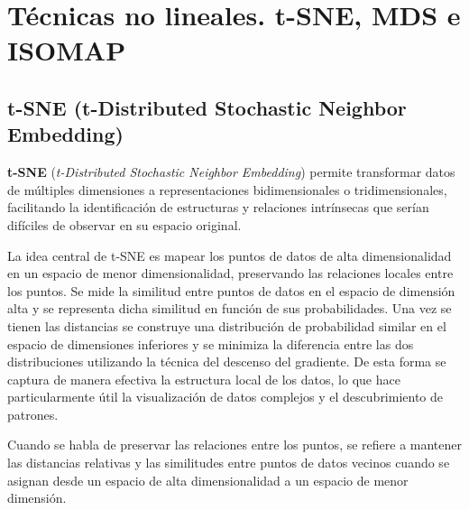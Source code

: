 \chapter{Técnicas no lineales. t-SNE, MDS e ISOMAP}

\section{t-SNE (t-Distributed Stochastic Neighbor Embedding)}

\textbf{t-SNE} (\textit{t-Distributed Stochastic Neighbor Embedding}) permite transformar datos de múltiples dimensiones a representaciones bidimensionales o tridimensionales, facilitando la identificación de estructuras y relaciones intrínsecas que serían difíciles de observar en su espacio original.

La idea central de t-SNE es mapear los puntos de datos de alta dimensionalidad en un espacio de menor dimensionalidad, preservando las relaciones locales entre los puntos. Se mide la similitud entre puntos de datos en el espacio de dimensión alta y se representa dicha similitud en función de sus probabilidades. Una vez se tienen las distancias se construye una distribución de probabilidad similar en el espacio de dimensiones inferiores y se minimiza la diferencia entre las dos distribuciones utilizando la técnica del descenso del gradiente. De esta forma se captura de manera efectiva la estructura local de los datos, lo que hace particularmente útil la visualización de datos complejos y el descubrimiento de patrones.

Cuando se habla de preservar las relaciones entre los puntos, se refiere a mantener las distancias relativas y las similitudes entre puntos de datos vecinos cuando se asignan desde un espacio de alta dimensionalidad a un espacio de menor dimensión.


